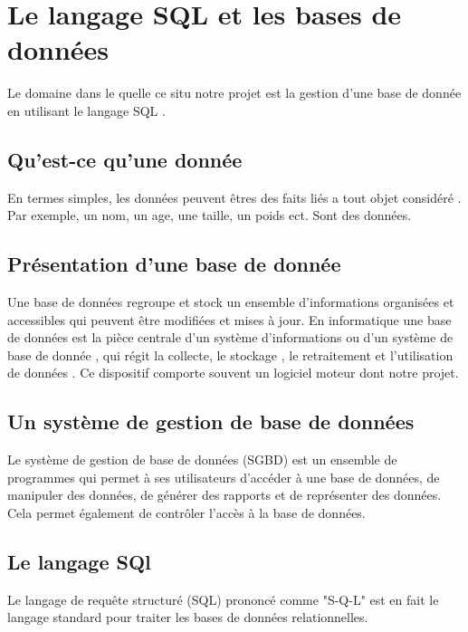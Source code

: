 \documentclass[oneside,13pt,a4paper]{report}
\begin{document}
    \chapter{Le langage SQL et les bases de données}

        Le domaine dans le quelle ce situ notre projet est la gestion d’une base de donnée en utilisant le langage SQL .

        \section{Qu’est-ce qu’une donnée}

            En termes simples, les données peuvent êtres des faits liés a tout objet considéré .
            Par exemple, un nom, un age, une taille, un poids ect. Sont des données.

        \section{Présentation d’une base de donnée}

            Une base de données regroupe et stock un ensemble d’informations organisées et accessibles qui peuvent être modifiées et mises à jour. En informatique une base de données est la pièce centrale d’un système d’informations ou d’un système de base de donnée , qui régit la collecte, le stockage , le retraitement et l’utilisation de données . Ce dispositif comporte souvent un logiciel moteur dont notre projet.

        \section{Un système de gestion de base de données}

            Le système de gestion de base de données (SGBD) est un ensemble de programmes qui permet à ses utilisateurs d'accéder à une base de données, de manipuler des données, de générer des rapports et de représenter des données.
            Cela permet également de contrôler l'accès à la base de données.

        \section{Le langage SQl}

            Le langage de requête structuré (SQL) prononcé comme "S-Q-L" est en fait le langage standard pour traiter les bases de données relationnelles.
\end{document}
